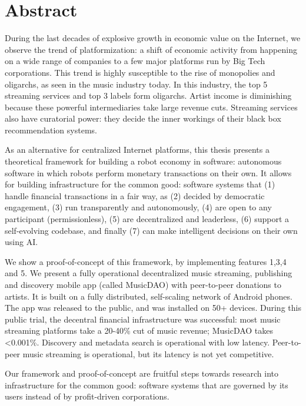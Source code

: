 \chapter*{Abstract}
During the last decades of explosive growth in economic value on the Internet, we observe the trend of platformization: a shift of economic activity from happening on a wide range of companies to a few major platforms run by Big Tech corporations. This trend is highly susceptible to the rise of monopolies and oligarchs, as seen in the music industry today. In this industry, the top 5 streaming services and top 3 labels form oligarchs. Artist income is diminishing because these powerful intermediaries take large revenue cuts. Streaming services also have curatorial power: they decide the inner workings of their black box recommendation systems. 

As an alternative for centralized Internet platforms, this thesis presents a theoretical framework for building a robot economy in software: autonomous software in which robots perform monetary transactions on their own. It allows for building infrastructure for the common good: software systems that (1) handle financial transactions in a fair way, as (2) decided by democratic engagement, (3) run transparently and autonomously, (4) are open to any participant (permissionless), (5) are decentralized and leaderless, (6) support a self-evolving codebase, and finally (7) can make intelligent decisions on their own using AI.

We show a proof-of-concept of this framework, by implementing features 1,3,4 and 5. We present a fully operational decentralized music streaming, publishing and discovery mobile app (called MusicDAO) with peer-to-peer donations to artists. It is built on a fully distributed, self-scaling network of Android phones. The app was released to the public, and was installed on 50+ devices. During this public trial, the decentral financial infrastructure was successful: most music streaming platforms take a 20-40\% cut of music revenue; MusicDAO takes <0.001\%. Discovery and metadata search is operational with low latency. Peer-to-peer music streaming is operational, but its latency is not yet competitive.

Our framework and proof-of-concept are fruitful steps towards research into infrastructure for the common good: software systems that are governed by its users instead of by profit-driven corporations.